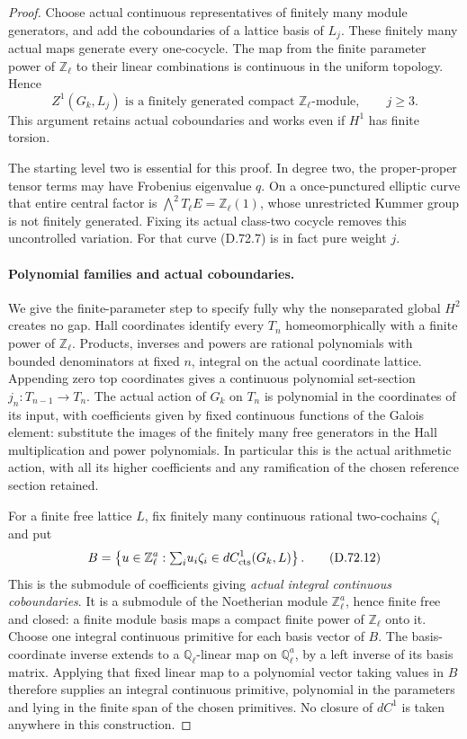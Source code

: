 \begin{proof}
Choose actual continuous representatives of finitely
many module generators, and add the coboundaries of
a lattice basis of \(L_j\). These finitely many
actual maps generate every one-cocycle. The map
from the finite parameter power of \(\mathbb Z_\ell\)
to their linear combinations is continuous in the
uniform topology. Hence
\[
 Z^1(G_k,L_j)\text{ is a finitely generated compact }
              \mathbb Z_\ell\text{-module},\qquad j\ge3.
                                                        \tag{D.72.11}
\]
This argument retains actual coboundaries and works
even if \(H^1\) has finite torsion.

The starting level two is essential for this proof.
In degree two, the proper-proper tensor terms may
have Frobenius eigenvalue \(q\). On a once-punctured
elliptic curve that entire central factor is
\(\bigwedge^2T_\ell E=\mathbb Z_\ell(1)\), whose
unrestricted Kummer group is not finitely generated.
Fixing its actual class-two cocycle removes this
uncontrolled variation. For that curve (D.72.7)
is in fact pure weight \(j\).

\paragraph{Polynomial families and actual coboundaries.}
We give the finite-parameter step to specify fully
why the nonseparated global \(H^2\) creates no gap.
Hall coordinates identify every \(T_n\) homeomorphically
with a finite power of \(\mathbb Z_\ell\). Products,
inverses and powers are rational polynomials with
bounded denominators at fixed \(n\), integral on the
actual coordinate lattice. Appending zero top
coordinates gives a continuous polynomial
set-section \(j_n:T_{n-1}\to T_n\).
The actual action of \(G_k\) on \(T_n\) is polynomial
in the coordinates of its input, with coefficients
given by fixed continuous functions of the Galois
element: substitute the images of the finitely
many free generators in the Hall multiplication
and power polynomials. In particular this is the
actual arithmetic action, with all its higher
coefficients and any ramification of the chosen
reference section retained.

For a finite free lattice \(L\), fix finitely many
continuous rational two-cochains \(\zeta_i\) and put
\[
 B=\left\{u\in\mathbb Z_\ell^a:
          {\textstyle\sum_i}u_i\zeta_i
                       \in dC^1_{\rm cts}(G_k,L)\right\}.
                                                        \tag{D.72.12}
\]
This is the submodule of coefficients giving
\emph{actual integral continuous coboundaries}.
It is a submodule of the Noetherian module
\(\mathbb Z_\ell^a\), hence finite free and closed:
a finite module basis maps a compact finite
power of \(\mathbb Z_\ell\) onto it. Choose one
integral continuous primitive for each basis
vector of \(B\). The basis-coordinate inverse
extends to a \(\mathbb Q_\ell\)-linear map on
\(\mathbb Q_\ell^a\), by a left inverse of its
basis matrix. Applying that fixed linear map
to a polynomial vector taking values in \(B\)
therefore supplies an integral continuous
primitive, polynomial in the parameters and
lying in the finite span of the chosen
primitives. No closure of \(dC^1\) is taken
anywhere in this construction.


\end{proof}
